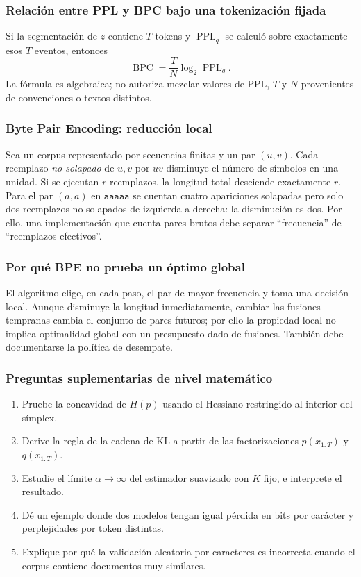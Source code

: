 \subsubsection{Relación entre PPL y BPC bajo una tokenización fijada}
Si la segmentación de $z$ contiene $T$ tokens y $\operatorname{PPL}_q$
se calculó sobre exactamente esos $T$ eventos, entonces
\[
\operatorname{BPC}=\frac{T}{N}\log_2\operatorname{PPL}_q.
\]
La fórmula es algebraica; no autoriza mezclar valores de PPL, $T$ y $N$
provenientes de convenciones o textos distintos.
\subsubsection{Byte Pair Encoding: reducción local}
Sea un corpus representado por secuencias finitas y un par $(u,v)$.
Cada reemplazo \emph{no solapado} de $u,v$ por $uv$ disminuye
el número de símbolos en una unidad. Si se ejecutan $r$ reemplazos,
la longitud total desciende exactamente $r$. Para el par $(a,a)$ en
$\texttt{aaaaa}$ se cuentan cuatro apariciones solapadas pero solo dos
reemplazos no solapados de izquierda a derecha: la disminución es dos.
Por ello, una implementación que cuenta pares brutos debe separar
``frecuencia'' de ``reemplazos efectivos''.
\subsubsection{Por qué BPE no prueba un óptimo global}
El algoritmo elige, en cada paso, el par de mayor frecuencia y toma una
decisión local. Aunque disminuye la longitud inmediatamente, cambiar las
fusiones tempranas cambia el conjunto de pares futuros; por ello la
propiedad local no implica optimalidad global con un presupuesto dado de
fusiones. También debe documentarse la política de desempate.
\subsubsection{Preguntas suplementarias de nivel matemático}
\begin{enumerate}
\item Pruebe la concavidad de $H(p)$ usando el Hessiano restringido al
interior del símplex.
\item Derive la regla de la cadena de KL a partir de las factorizaciones
$p(x_{1:T})$ y $q(x_{1:T})$.
\item Estudie el límite $\alpha\to\infty$ del estimador suavizado
con $K$ fijo, e interprete el resultado.
\item Dé un ejemplo donde dos modelos tengan igual pérdida en bits por
carácter y perplejidades por token distintas.
\item Explique por qué la validación aleatoria por caracteres es
incorrecta cuando el corpus contiene documentos muy similares.
\end{enumerate}
\clearpage

